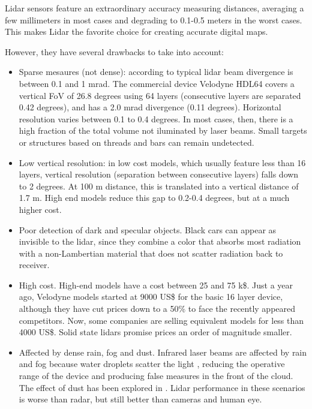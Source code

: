 Lidar sensors feature an extraordinary accuracy measuring distances, averaging
a few millimeters in most cases and degrading to 0.1-0.5 meters in the worst 
cases. This makes Lidar the favorite choice for creating accurate digital maps.

However, they have several drawbacks to take into account:

\begin{itemize}
    \item Sparse mesaures (not dense): according to \cite{Gatziolis2008} typical
    lidar beam divergence is between 0.1 and 1 mrad. 
    The commercial device Velodyne HDL64 covers a vertical FoV of 26.8 degrees 
    using 64 layers (consecutive layers are separated 0.42 degrees), and has a
    2.0 mrad divergence \cite{Glennie2010} (0.11 degrees). Horizontal resolution
    varies between 0.1 to 0.4 degrees. In most cases, then, there is a high 
    fraction of the total volume not iluminated by laser beams. Small targets or
    structures based on threads and bars can remain undetected.
    
    \item Low vertical resolution: in low cost models, which usually feature 
    less than 16 layers, vertical resolution (separation between consecutive
    layers) falls down to 2 degrees. At 100 m distance, this is translated into 
    a vertical distance of 1.7 m. High end models reduce this gap to 0.2-0.4 
    degrees, but at a much higher cost.
    
    \item Poor detection of dark and specular objects. Black cars
    can appear as invisible to the lidar, since they combine a color that
    absorbs most radiation with a non-Lambertian material that does not scatter
    radiation back to receiver.
    
    \item High cost. High-end models have a cost between 25 and 75 k\$.
    Just a year ago, Velodyne models started at 9000 US\$ for the basic 16
    layer device, although they have cut prices down to a 50\% to face the
    recently appeared competitors. Now, some companies are selling
    equivalent models for less than 4000 US\$. Solid state lidars promise
    prices an order of magnitude smaller.
    
    \item Affected by dense rain, fog and dust. Infrared laser
    beams are affected by rain and fog because water droplets scatter the light 
    \cite{Wang2008}, reducing the operative range of the device and producing 
    false measures in the front of the cloud. The effect of dust has been
    explored in \cite{Phillips2017}. Lidar performance in these scenarios is 
    worse than radar, but still better than cameras and human eye.
\end{itemize}

